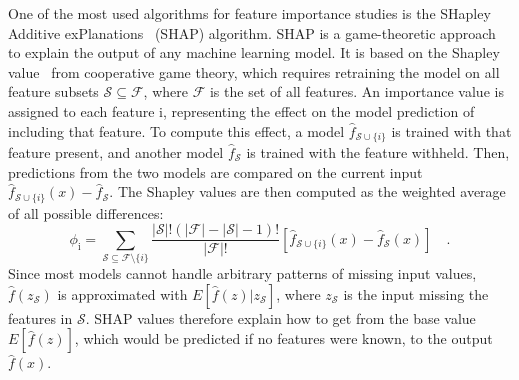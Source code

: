 One of the most used algorithms for feature importance studies is the SHapley Additive exPlanations~\cite{lundberg2017unified} (SHAP) algorithm. SHAP is a game-theoretic approach to explain the output of any machine learning model. It is based on the Shapley value~\cite{lipovetsky2001analysis} from cooperative game theory, which requires retraining the model on all feature subsets $\mathcal{S}\subseteq \mathcal{F}$, where $\mathcal{F}$ is the set of all features. An importance value is assigned to each feature i, representing the effect on the model prediction of including that feature. To compute this effect, a model $\widehat{f}_{\mathcal{S}\cup\{i\}}$ is trained with that feature present, and another model $\widehat{f}_\mathcal{S}$ is trained with the feature withheld. Then, predictions from the two
models are compared on the current input \mbox{$\widehat{f}_{\mathcal{S}\cup\{i\}} (x) - \widehat{f}_\mathcal{S}$}. The Shapley values are then computed as the weighted average of all possible differences:
\begin{equation*}
    \phi_\mathrm{i} = \sum_{\mathcal{S}\subseteq \mathcal{F}\setminus\{i\}} \frac{|\mathcal{S}|!(|\mathcal{F}|-|\mathcal{S}|-1)!}{|\mathcal{F}|!} \left[\widehat{f}_{\mathcal{S}\cup\{i\}}(x) - \widehat{f}_\mathcal{S}(x)\right]\quad .
\end{equation*}
Since most models cannot handle arbitrary patterns of missing input values, $\widehat{f} (z_\mathcal{S})$ is approximated with $E[\widehat{f}(z) | z_\mathcal{S}]$, where $z_\mathcal{S}$ is the input missing the features in $\mathcal{S}$. SHAP values therefore explain how to get from the base value $E[\widehat{f}(z)]$, which would be predicted if no features were known, to the output $\widehat{f}(x)$.

